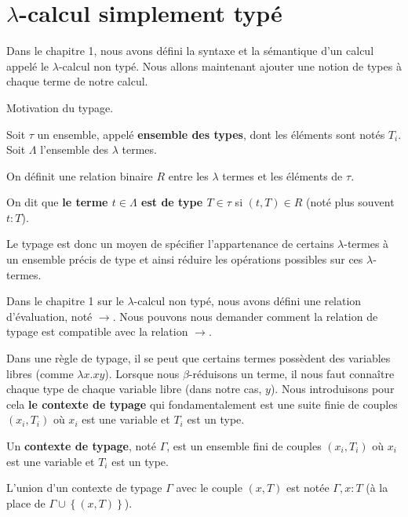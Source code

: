\chapter{$\lambda$-calcul simplement typé}

Dans le chapitre 1, nous avons défini la syntaxe et la sémantique d'un calcul
appelé le $\lambda$-calcul non typé. Nous allons maintenant ajouter une notion de types à
chaque terme de notre calcul.

Motivation du typage.

\begin{definition} 
  Soit $\tau$ un ensemble, appelé \textbf{ensemble des types}, dont les éléments
  sont notés $T_{i}$.
  Soit $\Lambda$ l'ensemble des $\lambda$ termes.

  On définit une relation binaire $R$ entre les
  $\lambda$ termes et les éléments de $\tau$.
  
  On dit que \textbf{le terme $t \in \Lambda$ est de type $T \in \tau$} si $(t, T)
  \in R$ (noté plus souvent $t : T$).
\end{definition}

Le typage est donc un moyen de spécifier l'appartenance de certains
$\lambda$-termes à un ensemble précis de type et ainsi réduire les opérations
possibles sur ces $\lambda$-termes.

Dans le chapitre 1 sur le $\lambda$-calcul non typé, nous avons défini une
relation d'évaluation, noté $\rightarrow$. Nous pouvons nous demander comment la
relation de typage est compatible avec la relation $\rightarrow$.

Dans une règle de typage, il se peut que certains termes possèdent des variables
libres (comme $\lambda x. x y$). Lorsque nous $\beta$-réduisons un terme, il nous
faut connaître chaque type de chaque variable libre (dans notre cas, $y$). Nous
introduisons pour cela \textbf{le contexte de typage} qui fondamentalement est
une suite finie de couples $(x_{i}, T_{i})$ où $x_{i}$ est une variable et
$T_{i}$ est un type.

\begin{definition} 
  Un \textbf{contexte de typage}, noté $\Gamma$, est un ensemble fini de couples $(x_{i},
  T_{i})$ où $x_{i}$ est une variable et $T_{i}$ est un type.
  
  L'union d'un contexte de typage $\Gamma$ avec le couple $(x, T)$ est notée
  $\Gamma, x : T$ (à la place de $\Gamma \cup \left\{(x, T)\right\}$).
\end{definition}


